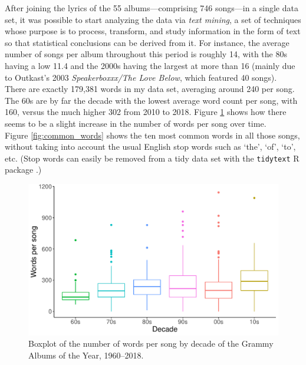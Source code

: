 \documentclass{article}
\begin{document}
After joining the lyrics of the 55 albums---comprising 746 songs---in a single data set, it was possible to start analyzing the data via \textit{text mining}, a set of techniques whose purpose is to process, transform, and study information in the form of text so that statistical conclusions can be derived from it. For instance, the average number of songs per album throughout this period is roughly 14, with the 80s having a low 11.4 and the 2000s having the largest at more than 16 (mainly due to Outkast's 2003 \textit{Speakerboxxx/The Love Below}, which featured 40 songs). \\


There are exactly 179,381 words in my data set, averaging around 240 per song. The 60s are by far the decade with the lowest average word count per song, with 160, versus the much higher 302 from 2010 to 2018. Figure \ref{fig:boxplot_WpS} shows how there seems to be a slight increase in the number of words per song over time. \\

Figure \ref{fig:common_words} shows the ten most common words in all those songs, without taking into account the usual English stop words such as `the', `of', `to', etc. (Stop words can easily be removed from a tidy data set with the \texttt{tidytext} \textsf{R} package \citep{text_mining_r}.)

\begin{figure}[h]
    \centering
    \includegraphics[scale=0.5]{Plots/Boxplot_WpS.pdf}
    \caption{Boxplot of the number of words per song by decade of the Grammy Albums of the Year, 1960--2018.}
    \label{fig:boxplot_WpS}
\end{figure}
\end{document}
